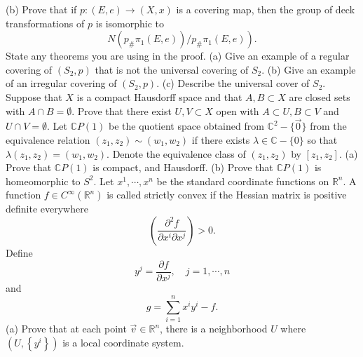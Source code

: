 \documentclass[10pt]{article}
\begin{document}
(b) Prove that if $p:(E, e) \rightarrow(X, x)$ is a covering map, then the group of deck transformations of $p$ is isomorphic to
$$
\left.N\left(p_{\#} \pi_{1}(E, e)\right) / p_{\#} \pi_{1}(E, e)\right) .
$$
State any theorems you are using in the proof.
\newpage
(a) Give an example of a regular covering of $\left(S_{2}, p\right)$ that is not the universal covering of $S_{2}$.
(b) Give an example of an irregular covering of $\left(S_{2}, p\right)$.
(c) Describe the universal cover of $S_{2}$.
\newpage
Suppose that $X$ is a compact Hausdorff space and that $A, B \subset X$ are closed sets with $A \cap B=\emptyset$. Prove that there exist $U, V \subset X$ open with $A \subset U, B \subset V$ and $U \cap V=\emptyset$.
\newpage
Let $\mathbb{C} P(1)$ be the quotient space obtained from $\mathbb{C}^{2}-\{\overrightarrow{0}\}$ from the equivalence relation $\left(z_{1}, z_{2}\right) \sim\left(w_{1}, w_{2}\right)$ if there exists $\lambda \in \mathbb{C}-\{0\}$ so that $\lambda\left(z_{1}, z_{2}\right)=\left(w_{1}, w_{2}\right)$. Denote the equivalence class of $\left(z_{1}, z_{2}\right)$ by $\left[z_{1}, z_{2}\right]$.
(a) Prove that $\mathbb{C} P(1)$ is compact, and Hausdorff.
(b) Prove that $\mathbb{C} P(1)$ is homeomorphic to $S^{2}$.
\newpage
Let $x^{1}, \cdots, x^{n}$ be the standard coordinate functions on $\mathbb{R}^{n}$. A function $f \in C^{\infty}\left(\mathbb{R}^{n}\right)$ is called strictly convex if the Hessian matrix is positive definite everywhere
$$
\left(\frac{\partial^{2} f}{\partial x^{i} \partial x^{j}}\right)>0 .
$$
Define
$$
y^{j}=\frac{\partial f}{\partial x^{j}}, \quad j=1, \cdots, n
$$
and
$$
g=\sum_{i=1}^{n} x^{i} y^{i}-f .
$$
(a) Prove that at each point $\vec{v} \in \mathbb{R}^{n}$, there is a neighborhood $U$ where $\left(U,\left\{y^{i}\right\}\right)$ is a local coordinate system.
\end{document}

